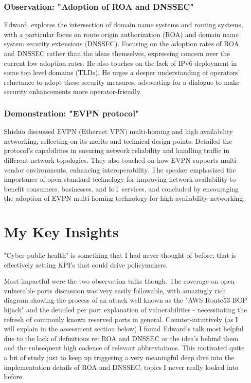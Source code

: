 \documentclass[twocolumn]{article}
\begin{document}
\subsubsection*{Observation: "Adoption of ROA and DNSSEC"}
Edward, explores the intersection of domain name systems and routing systems, with a particular focus on route origin authorization (ROA) and domain name system security extensions (DNSSEC). Focusing on the adoption rates of ROA and DNSSEC rather than the ideas themselves, expressing concern over the current low adoption rates. He also touches on the lack of IPv6 deployment in some top level domains (TLDs). He urges a deeper understanding of operators' reluctance to adopt these security measures, advocating for a dialogue to make security enhancements more operator-friendly.

\subsubsection*{Demonstration: "EVPN protocol"}
Shishio discussed EVPN (Ethernet VPN) multi-homing and high availability networking, reflecting on its merits and technical design points. Detailed the protocol's capabilities in ensuring network reliability and handling traffic in different network topologies. They also touched on how EVPN supports multi-vendor environments, enhancing interoperability. The speaker emphasized the importance of open standard technology for improving network availability to benefit consumers, businesses, and IoT services, and concluded by encouraging the adoption of EVPN multi-homing technology for high availability networking.

\section*{My Key Insights}
"Cyber public health" is something that I had never thought of before; that is effectively setting KPI's that could drive policymakers.

Most impactful were the two observation talks though. The coverage on open vulnerable ports discussion was very easily followable, with amazingly rich diagram showing the process of an attack well known as the "AWS Route53 BGP hijack" and the detailed per port explanation of vulnerabilities - necessitating the refresh of commonly known reserved ports in general. Counter-intuitively (as I will explain in the assessment section below) I found Edward's talk most helpful due to the lack of definitions re: ROA and DNSSEC or the idea's behind them and the subsequent high cadence of relevant abbreviations. This motivated quite a bit of study just to keep up triggering a very meaningful deep dive into the implementation details of ROA and DNSSEC, topics I never really looked into before.
\end{document}
